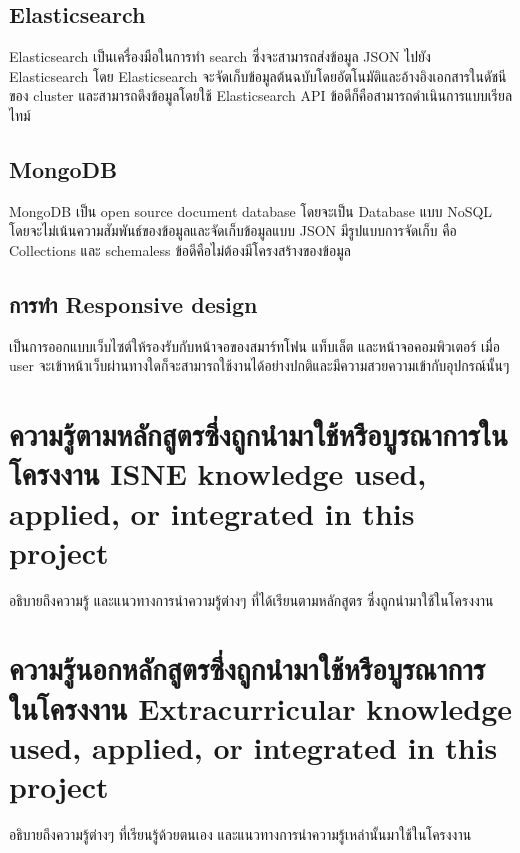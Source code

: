 \subsection{Elasticsearch}
Elasticsearch เป็นเครื่องมือในการทำ search ซึ่งจะสามารถส่งข้อมูล JSON ไปยัง Elasticsearch โดย Elasticsearch จะจัดเก็บข้อมูลต้นฉบับโดยอัตโนมัติและอ้างอิงเอกสารในดัชนีของ cluster และสามารถดึงข้อมูลโดยใช้ Elasticsearch API ข้อดีก็คือสามารถดำเนินการแบบเรียลไทม์\cite{elastic}

\subsection{MongoDB}
MongoDB เป็น open source document database โดยจะเป็น Database แบบ NoSQL โดยจะไม่เน้นความสัมพันธ์ของข้อมูลและจัดเก็บข้อมูลแบบ JSON มีรูปแบบการจัดเก็บ คือ Collections และ schemaless ข้อดีคือไม่ต้องมีโครงสร้างของข้อมูล \cite{mongodb}

\subsection{การทำ Responsive design}
เป็นการออกแบบเว็บไซต์ให้รองรับกับหน้าจอของสมาร์ทโฟน แท็บเล็ต และหน้าจอคอมพิวเตอร์ เมื่อ user จะเข้าหน้าเว็บผ่านทางใดก็จะสามารถใช้งานได้อย่างปกติและมีความสวยความเข้ากับอุปกรณ์นั้นๆ 


\section{\ifcpe%
ความรู้ตามหลักสูตรซึ่งถูกนำมาใช้หรือบูรณาการในโครงงาน
\else%
ISNE knowledge used, applied, or integrated in this project
\fi
}

อธิบายถึงความรู้ และแนวทางการนำความรู้ต่างๆ ที่ได้เรียนตามหลักสูตร ซึ่งถูกนำมาใช้ในโครงงาน

\section{\ifcpe%
ความรู้นอกหลักสูตรซึ่งถูกนำมาใช้หรือบูรณาการในโครงงาน
\else%
Extracurricular knowledge used, applied, or integrated in this project
\fi
}

อธิบายถึงความรู้ต่างๆ ที่เรียนรู้ด้วยตนเอง และแนวทางการนำความรู้เหล่านั้นมาใช้ในโครงงาน
